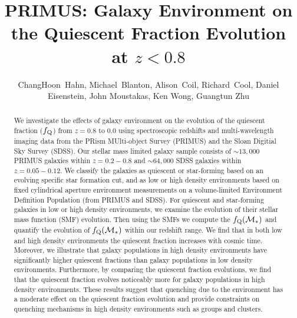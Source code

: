 \documentclass{emulateapj}
\begin{document}
\title{PRIMUS: Galaxy Environment on the Quiescent Fraction Evolution at $z < 0.8$}
\author{
ChangHoon~Hahn, 
Michael~Blanton, 
Alison~Coil, 
Richard~Cool, 
Daniel Eisenstein,
John Moustakas, 
Ken Wong, 
Guangtun Zhu
}
\begin{abstract}
We investigate the effects of galaxy environment on the evolution of the quiescent fraction ($f_{\rm{Q}}$) from $z =0.8 $ to $ 0.0$ using spectroscopic redshifts and multi-wavelength imaging data from the PRism MUlti-object Survey (PRIMUS) and the Sloan Digitial Sky Survey (SDSS). Our stellar mass limited galaxy sample consists of $\sim 13,000$ PRIMUS galaxies within $z = 0.2-0.8$ and $\sim 64,000$ SDSS galaxies within $z = 0.05-0.12$. We classify the galaxies as quiescent or star-forming based on an evolving specific star formation cut, and as low or high density environments based on fixed cylindrical aperture environment measurements on a volume-limited Environment Definition Population (from PRIMUS and SDSS). For quiescent and star-forming galaxies in low or high density environments, we examine the evolution of their stellar mass function (SMF) evolution. Then using the SMFs we compute the $f_{\rm{Q}}(\mathcal{M}_{*})$ and quantify the evolution of $f_{\rm{Q}}(\mathcal{M}_{*})$ within our redshift range. We find that in both low and high density environments the quiescent fraction increases with cosmic time. Moreover, we illustrate that galaxy populations in high density environments have significantly higher quiescent fractions than galaxy populations in low density environments. Furthermore, by comparing the quiescent fraction evolutions, we find that the quiescent fraction evolves noticeably more for galaxy populations in high density environments. These results suggest that quenching due to the environment has a moderate effect on the quiescent fraction evolution and provide constraints on quenching mechanisms in high density environments such as groups and clusters. 
\end{abstract}
\end{document}
